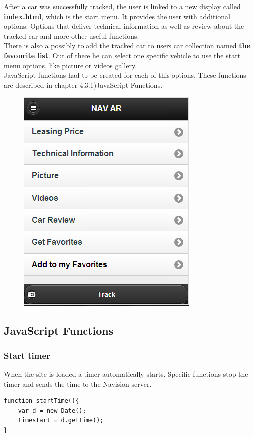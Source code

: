 After a car was successfully tracked, the user is linked to a new display called \textbf{index.html}, which is the start menu. It provides the user with additional options. Options that deliver technical information as well as review about the tracked car and more other useful functions. 
\\

There is also a possibly to add the tracked car to users car collection named \textbf{the favourite list}. Out of there he can select one specific vehicle to use the start menu options, like picture or videos gallery.
\\

JavaScript functions had to be created for each  of this options. These functions are described in chapter 4.3.1)JavaScript Functions.
\\

\begin{figure}[h]
\centering
\includegraphics[width=0.5\linewidth]{graphics/chapter4/3}
\caption{}
\label{fig:3}
\end{figure}
\newpage

\subsection{JavaScript Functions}

\subsubsection{Start timer}
When the site is loaded a timer automatically starts. Specific functions stop the timer and sends the time to the Navision server.
\\
\begin{lstlisting}[language=html, caption= 
Start timer function,captionpos=b]
function startTime(){
	var d = new Date();
	timestart = d.getTime();
}
\end{lstlisting}


